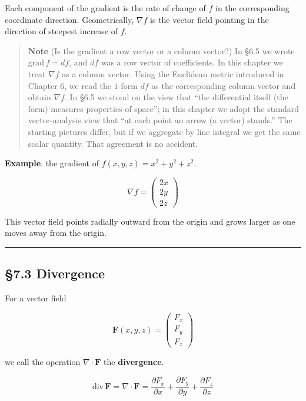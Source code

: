 Each component of the gradient is the rate of change of \(f\) in the
corresponding coordinate direction. Geometrically, \(\nabla f\) is the
vector field pointing in the direction of steepest increase of \(f\).

\begin{quote}
\textbf{Note} (Is the gradient a row vector or a column vector?) In §6.5
we wrote \(\mathrm{grad}\,f = df\), and \(df\) was a row vector of
coefficients. In this chapter we treat \(\nabla f\) as a column vector.
Using the Euclidean metric introduced in Chapter 6, we read the
\(1\)-form \(df\) as the corresponding column vector and obtain
\(\nabla f\). In §6.5 we stood on the view that ``the differential
itself (the form) measures properties of space''; in this chapter we
adopt the standard vector-analysis view that ``at each point an arrow (a
vector) stands.'' The starting pictures differ, but if we aggregate by
line integral we get the same scalar quantity. That agreement is no
accident.
\end{quote}

\textbf{Example}: the gradient of \(f(x,y,z) = x^2 + y^2 + z^2\).

\[\nabla f = \begin{pmatrix} 2x \\ 2y \\ 2z \end{pmatrix}\]

This vector field points radially outward from the origin and grows
larger as one moves away from the origin.

\begin{center}\rule{0.5\linewidth}{0.5pt}\end{center}

\hypertarget{divergence}{%
\subsection{§7.3 Divergence}\label{divergence}}

For a vector field

\[
\mathbf{F}(x,y,z)
=
\begin{pmatrix}
F_x\\
F_y\\
F_z
\end{pmatrix}
\]

we call the operation \(\nabla\cdot\mathbf{F}\) the \textbf{divergence}.

\[\mathrm{div}\,\mathbf{F} = \nabla \cdot \mathbf{F} = \frac{\partial F_x}{\partial x} + \frac{\partial F_y}{\partial y} + \frac{\partial F_z}{\partial z}\]

